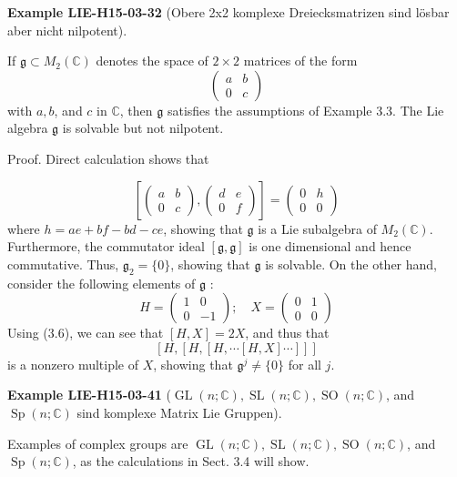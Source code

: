\documentclass[10pt, letterpaper]{article}
\newcommand{\CustomHeading}[3]{%
  \par\medskip\noindent%
  \textbf{#1 #2} \textnormal{(#3)}.\enskip%
}
\newenvironment{EXA}[2]{\CustomHeading{Example}{#1}{#2}}{}
\begin{document}
\begin{EXA}{LIE-H15-03-32}{Obere 2x2 komplexe Dreiecksmatrizen sind lösbar aber nicht nilpotent}
If $\mathfrak{g} \subset M_{2}(\mathbb{C})$ denotes the space of $2 \times 2$ matrices of the form
$$
\left(\begin{array}{ll}
a & b \\
0 & c
\end{array}\right)
$$
with $a, b$, and $c$ in $\mathbb{C}$, then $\mathfrak{g}$ satisfies the assumptions of Example 3.3. The Lie algebra $\mathfrak{g}$ is solvable but not nilpotent.

Proof. Direct calculation shows that

$$
\left[\left(\begin{array}{ll}
a & b \\
0 & c
\end{array}\right),\left(\begin{array}{ll}
d & e \\
0 & f
\end{array}\right)\right]=\left(\begin{array}{ll}
0 & h \\
0 & 0
\end{array}\right)
$$
where $h=a e+b f-b d-c e$, showing that $\mathfrak{g}$ is a Lie subalgebra of $M_{2}(\mathbb{C})$. Furthermore, the commutator ideal $[\mathfrak{g}, \mathfrak{g}]$ is one dimensional and hence commutative. Thus, $\mathfrak{g}_{2}=\{0\}$, showing that $\mathfrak{g}$ is solvable. On the other hand, consider the following elements of $\mathfrak{g}$ :
$$
H=\left(\begin{array}{rr}
1 & 0 \\
0 & -1
\end{array}\right) ; \quad X=\left(\begin{array}{ll}
0 & 1 \\
0 & 0
\end{array}\right)
$$
Using (3.6), we can see that $[H, X]=2 X$, and thus that
$$
[H,[H,[H, \cdots[H, X] \cdots]]]
$$
is a nonzero multiple of $X$, showing that $\mathfrak{g}^{j} \neq\{0\}$ for all $j$.
\end{EXA}

\begin{EXA}{LIE-H15-03-41}{$\operatorname{GL}(n ; \mathbb{C}), \operatorname{SL}(n ; \mathbb{C}), \operatorname{SO}(n ; \mathbb{C})$, and $\operatorname{Sp}(n ; \mathbb{C})$ sind komplexe Matrix Lie Gruppen}
Examples of complex groups are $\operatorname{GL}(n ; \mathbb{C}), \operatorname{SL}(n ; \mathbb{C}), \operatorname{SO}(n ; \mathbb{C})$, and $\operatorname{Sp}(n ; \mathbb{C})$, as the calculations in Sect. 3.4 will show.
\end{EXA}
\end{document}
